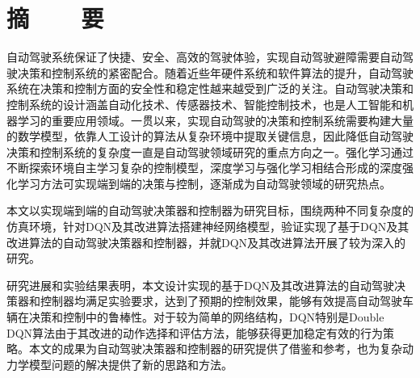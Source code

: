 %
%
%
%
%

\vspace*{-11mm}

\begin{center}
  \heiti{}\textbf{\thesisTitle}
\end{center}

\vspace*{2mm}

{\let\clearpage\relax \chapter*{\textmd{摘~~~~要}}}
\setcounter{page}{1}

\vspace*{1mm}

\setlength{\parskip}{0em}

自动驾驶系统保证了快捷、安全、高效的驾驶体验，实现自动驾驶避障需要自动驾驶决策和控制系统的紧密配合。随着近些年硬件系统和软件算法的提升，自动驾驶系统在决策和控制方面的安全性和稳定性越来越受到广泛的关注。自动驾驶决策和控制系统的设计涵盖自动化技术、传感器技术、智能控制技术，也是人工智能和机器学习的重要应用领域。一贯以来，实现自动驾驶的决策和控制系统需要构建大量的数学模型，依靠人工设计的算法从复杂环境中提取关键信息，因此降低自动驾驶决策和控制系统的复杂度一直是自动驾驶领域研究的重点方向之一。强化学习通过不断探索环境自主学习复杂的控制模型，深度学习与强化学习相结合形成的深度强化学习方法可实现端到端的决策与控制，逐渐成为自动驾驶领域的研究热点。

本文以实现端到端的自动驾驶决策器和控制器为研究目标，围绕两种不同复杂度的仿真环境，针对DQN及其改进算法搭建神经网络模型，验证实现了基于DQN及其改进算法的自动驾驶决策器和控制器，并就DQN及其改进算法开展了较为深入的研究。

研究进展和实验结果表明，本文设计实现的基于DQN及其改进算法的自动驾驶决策器和控制器均满足实验要求，达到了预期的控制效果，能够有效提高自动驾驶车辆在决策和控制中的鲁棒性。对于较为简单的网络结构，DQN特别是Double DQN算法由于其改进的动作选择和评估方法，能够获得更加稳定有效的行为策略。本文的成果为自动驾驶决策器和控制器的研究提供了借鉴和参考，也为复杂动力学模型问题的解决提供了新的思路和方法。

